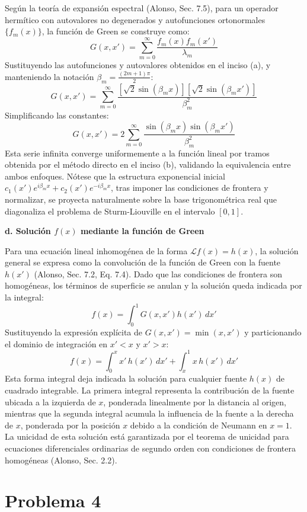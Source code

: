 \documentclass[a4paper]{article}
\begin{document}
Según la teoría de expansión espectral (Alonso, Sec. 7.5), para un operador hermítico con autovalores no degenerados y autofunciones ortonormales $\{f_m(x)\}$, la función de Green se construye como:
$$ G(x, x') = \sum_{m=0}^\infty \frac{f_m(x) f_m(x')}{\lambda_m} $$
Sustituyendo las autofunciones y autovalores obtenidos en el inciso (a), y manteniendo la notación $\beta_m = \frac{(2m+1)\pi}{2}$:
$$ G(x, x') = \sum_{m=0}^\infty \frac{\left[ \sqrt{2} \sin(\beta_m x) \right] \left[ \sqrt{2} \sin(\beta_m x') \right]}{\beta_m^2} $$
Simplificando las constantes:
$$ G(x, x') = 2 \sum_{m=0}^\infty \frac{\sin(\beta_m x) \sin(\beta_m x')}{\beta_m^2} $$
Esta serie infinita converge uniformemente a la función lineal por tramos obtenida por el método directo en el inciso (b), validando la equivalencia entre ambos enfoques. Nótese que la estructura exponencial inicial $c_1(x')e^{i\beta_m x} + c_2(x')e^{-i\beta_m x}$, tras imponer las condiciones de frontera y normalizar, se proyecta naturalmente sobre la base trigonométrica real que diagonaliza el problema de Sturm-Liouville en el intervalo $[0,1]$.

\textbf{d. Solución $f(x)$ mediante la función de Green}

Para una ecuación lineal inhomogénea de la forma $\mathscr{L}f(x) = h(x)$, la solución general se expresa como la convolución de la función de Green con la fuente $h(x')$ (Alonso, Sec. 7.2, Eq. 7.4). Dado que las condiciones de frontera son homogéneas, los términos de superficie se anulan y la solución queda indicada por la integral:
$$ f(x) = \int_0^1 G(x, x') h(x') \, dx' $$
Sustituyendo la expresión explícita de $G(x, x') = \min(x, x')$ y particionando el dominio de integración en $x' < x$ y $x' > x$:
$$ f(x) = \int_0^x x' \, h(x') \, dx' + \int_x^1 x \, h(x') \, dx' $$
Esta forma integral deja indicada la solución para cualquier fuente $h(x)$ de cuadrado integrable. La primera integral representa la contribución de la fuente ubicada a la izquierda de $x$, ponderada linealmente por la distancia al origen, mientras que la segunda integral acumula la influencia de la fuente a la derecha de $x$, ponderada por la posición $x$ debido a la condición de Neumann en $x=1$. La unicidad de esta solución está garantizada por el teorema de unicidad para ecuaciones diferenciales ordinarias de segundo orden con condiciones de frontera homogéneas (Alonso, Sec. 2.2).


\section{Problema 4}
\end{document}

